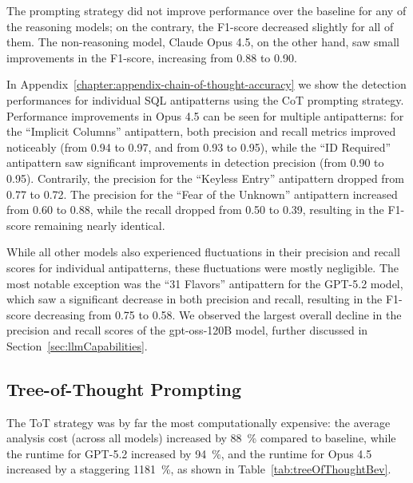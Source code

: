 The prompting strategy did not improve performance over the baseline for any of the reasoning models; on the contrary, the F1-score decreased slightly for all of them. The non-reasoning model, Claude Opus 4.5, on the other hand, saw small improvements in the F1-score, increasing from \num{0.88} to \num{0.90}.

In Appendix~\ref{chapter:appendix-chain-of-thought-accuracy} we show the detection performances for individual SQL antipatterns using the CoT prompting strategy. Performance improvements in Opus 4.5 can be seen for multiple antipatterns: for the “Implicit Columns” antipattern, both precision and recall metrics improved noticeably (from \num{0.94} to \num{0.97}, and from \num{0.93} to \num{0.95}), while the “ID Required” antipattern saw significant improvements in detection precision (from \num{0.90} to \num{0.95}). Contrarily, the precision for the “Keyless Entry” antipattern dropped from \num{0.77} to \num{0.72}. The precision for the “Fear of the Unknown” antipattern increased from \num{0.60} to \num{0.88}, while the recall dropped from \num{0.50} to \num{0.39}, resulting in the F1-score remaining nearly identical.

While all other models also experienced fluctuations in their precision and recall scores for individual antipatterns, these fluctuations were mostly negligible. The most notable exception was the “31 Flavors” antipattern for the GPT-5.2 model, which saw a significant decrease in both precision and recall, resulting in the F1-score decreasing from \num{0.75} to \num{0.58}. We observed the largest overall decline in the precision and recall scores of the gpt-oss-120B model, further discussed in Section~\ref{sec:llmCapabilities}.

\subsection{Tree-of-Thought Prompting}

The ToT strategy was by far the most computationally expensive: the average analysis cost (across all models) increased by \qty{88}{\percent} compared to baseline, while the runtime for GPT-5.2 increased by \qty{94}{\percent}, and the runtime for Opus 4.5 increased by a staggering \qty{1181}{\percent}, as shown in Table~\ref{tab:treeOfThoughtBev}.

